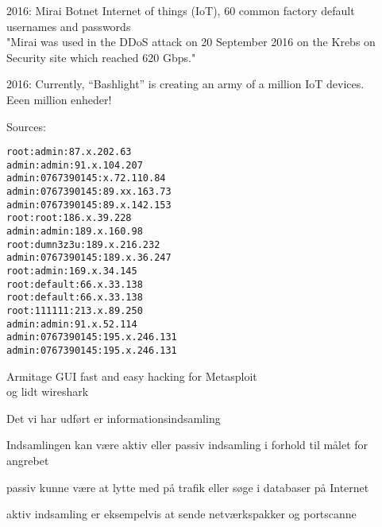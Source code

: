 \documentclass[20pt,landscape,a4paper]{foils}
\begin{document}
\begin{list1}
\item 2016: Mirai Botnet Internet of things (IoT), 60 common factory default usernames and passwords\\
"Mirai was used in the DDoS attack on 20 September 2016 on the Krebs on Security site which reached 620 Gbps."

\item 2016: Currently, “Bashlight” is creating an army of a million IoT devices.\\
Eeen million enheder!

\end{list1}

Sources: \\
{\footnotesize{}}



\begin{alltt}
root:admin:87.x.202.63
admin:admin:91.x.104.207
admin:0767390145:x.72.110.84
admin:0767390145:89.xx.163.73
admin:0767390145:89.x.142.153
root:root:186.x.39.228
admin:admin:189.x.160.98
root:dumn3z3u:189.x.216.232
admin:0767390145:189.x.36.247
root:admin:169.x.34.145
root:default:66.x.33.138
root:default:66.x.33.138
root:111111:213.x.89.250
admin:admin:91.x.52.114
admin:0767390145:195.x.246.131
admin:0767390145:195.x.246.131
\end{alltt}




Armitage GUI fast and easy hacking for Metasploit\\
 og lidt wireshark


\begin{list1}
\item Det vi har udført er informationsindsamling
\item Indsamlingen kan være aktiv eller passiv indsamling i forhold
  til målet for angrebet
\item passiv kunne være at lytte med på trafik eller søge i databaser
  på Internet
\item aktiv indsamling er eksempelvis at sende netværkspakker og portscanne
\end{list1}
\end{document}
